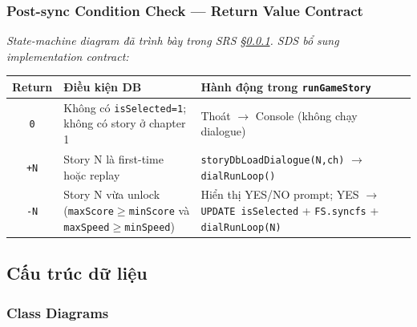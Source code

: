 \documentclass[12pt,a4paper]{article}
\begin{document}
\subsubsection{Post-sync Condition Check --- Return Value Contract}\label{sec:postSyncSRS}

\noindent\textit{State-machine diagram đã trình bày trong SRS §\ref{sec:postSyncSRS}.
SDS bổ sung implementation contract:}

\begin{center}\small
\begin{tabular}{@{}c p{4.5cm} p{5.5cm}@{}}
\hline
\textbf{Return} & \textbf{Điều kiện DB} & \textbf{Hành động trong \texttt{runGameStory}} \\
\hline
\texttt{0}  & Không có \texttt{isSelected=1};
            không có story ở chapter 1
            & Thoát $\rightarrow$ Console (không chạy dialogue) \\
\texttt{+N} & Story N là first-time hoặc replay
            & \texttt{storyDbLoadDialogue(N,ch)} $\rightarrow$ \texttt{dialRunLoop()} \\
\texttt{-N} & Story N vừa unlock (\texttt{maxScore$\geq$minScore} và
              \texttt{maxSpeed$\geq$minSpeed})
            & Hiển thị YES/NO prompt;
              YES $\rightarrow$ \texttt{UPDATE isSelected} +
              \texttt{FS.syncfs} + \texttt{dialRunLoop(N)} \\
\hline
\end{tabular}
\end{center}

\subsection{Cấu trúc dữ liệu}

\subsubsection{Class Diagrams}
\end{document}
